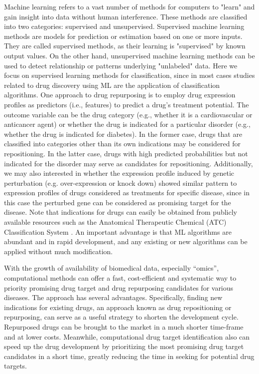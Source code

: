     Machine learning refers to a vast number of methods for computers to "learn" and gain insight into data without human interference. These methods are classified into two categories: supervised and unsupervised. Supervised machine learning methods are models for prediction or estimation based on one or more inputs. They are called supervised methods, as their learning is "supervised" by known output values. On the other hand, unsupervised machine learning methods can be used to detect relationship or patterns underlying "unlabeled" data. Here we focus on supervised learning methods for classification, since in most cases studies related to drug discovery using ML are the application of classification algorithms. One approach to drug repurposing is to employ drug expression profiles as predictors (i.e., features) to predict a drug’s treatment potential. The outcome variable can be the drug category (e.g., whether it is a cardiovascular or anticancer agent) or whether the drug is indicated for a particular disorder (e.g., whether the drug is indicated for diabetes). In the former case, drugs that are classified into categories other than its own indications may be considered for repositioning. In the latter case, drugs with high predicted probabilities but not indicated for the disorder may serve as candidates for repositioning. Additionally, we may also interested in whether the expression profile induced by genetic perturbation (e.g. over-expression or knock down) showed similar pattern to expression profiles of drugs considered as treatments for specific disease, since in this case the perturbed gene can be considered as promising target for the disease. Note that indications for drugs can easily be obtained from publicly available resources such as the Anatomical Therapeutic Chemical (ATC) Classification System \cite{wei2013development}. An important advantage is that ML algorithms are abundant and in rapid development, and any existing or new algorithms can be applied without much modification.

    With the growth of availability of biomedical data, especially “omics”, computational methods can offer a fast, cost-efficient and systematic way to priority promising drug target and drug repurposing candidates for various diseases. The approach has several advantages. Specifically, finding new indications for existing drugs, an approach known as drug repositioning or repurposing, can serve as a useful strategy to shorten the development cycle. Repurposed drugs can be brought to the market in a much shorter time-frame and at lower costs. Meanwhile, computational drug target identification also can speed up the drug development by prioritizing the most promising drug target candidates in a short time, greatly reducing the time in seeking for potential drug targets. 

